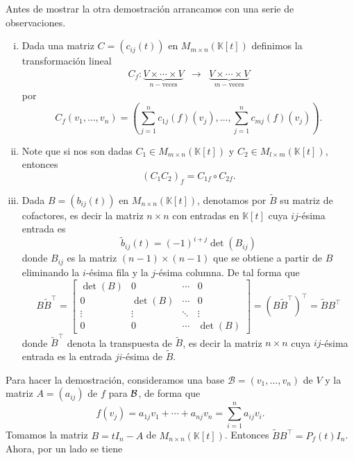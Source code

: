 \begin{obs}
  Antes de mostrar la otra demostración arrancamos con una serie de observaciones.
  \begin{enumerate}[(i)]
    \item Dada una matriz $C=\left(c_{ij}(t)\right)$ en $M_{m\times n}(\mathbb{K}[t])$ definimos la transformaci\'on lineal
      \begin{eqnarray*}
        C_f:\underbrace{V\times\cdots\times V}_{n-\textrm{veces}} &\longrightarrow & \underbrace{V\times\cdots\times V}_{m-\textrm{veces}}
      \end{eqnarray*}
      por
      \[
        C_f(v_1,\ldots,v_n)=\left(\sum_{j=1}^nc_{1j}(f)(v_j),\ldots,\sum_{j=1}^nc_{mj}(f)(v_j)\right).
      \]
  \item Note que si nos son dadas $C_1\in M_{m\times n}(\mathbb{K}[t])$ y $C_2\in M_{l\times m}(\mathbb{K}[t])$, entonces 
      \[
        \left(C_1C_2\right)_f=C_{1 f}\circ C_{2 f}. 
      \]
  \item Dada $B=\left(b_{ij}(t)\right)$ en $M_{n\times n}(\mathbb{K}[t])$, denotamos por $\tilde{B}$ su matriz de cofactores, es decir la matriz $n\times n$ con entradas en $\mathbb{K}[t]$ cuya $ij$-\'esima entrada es
      \[
         \tilde{b}_{ij}(t)=(-1)^{i+j}\det(B_{ij})
      \]
    donde $B_{ij}$ es la matriz $(n-1)\times(n-1)$ que se obtiene a partir de $B$ eliminando la $i$-\'esima fila y la $j$-\'esima columna. De tal forma que
      \[
        B\tilde{B}^\intercal=\left[\begin{array}{cccc}
          \det(B) & 0 & \cdots & 0\\
          0 & \det(B) & \cdots & 0\\
          \vdots & \vdots & \ddots &\vdots\\
          0 & 0 &\cdots & \det(B)
          \end{array}\right]=(B\tilde{B}^\intercal)^\intercal=\tilde{B}B^\intercal
      \]
    donde $\tilde{B}^\intercal$ denota la transpuesta de $\tilde{B}$, es decir la matriz $n\times n$ cuya $ij$-\'esima entrada es la entrada $ji$-\'esima de $\tilde{B}$.
  \end{enumerate}
  Para hacer la demostración, consideramos una base $\mathcal{B}=(v_1,\ldots,v_n)$ de $V$ y la matriz $A=(a_{ij})$ de $f$ para $\mathcal{B}$, de forma que $$f(v_j)=a_{1j}v_1+\cdots+a_{nj}v_n=\sum_{i=1}^na_{ij}v_i.$$
Tomamos la matriz $B=tI_n-A$ de $M_{n\times n}(\mathbb{K}[t])$. Entonces $\tilde{B}B^\intercal=P_f(t)I_n$. Ahora, por un lado se tiene

\end{obs}
